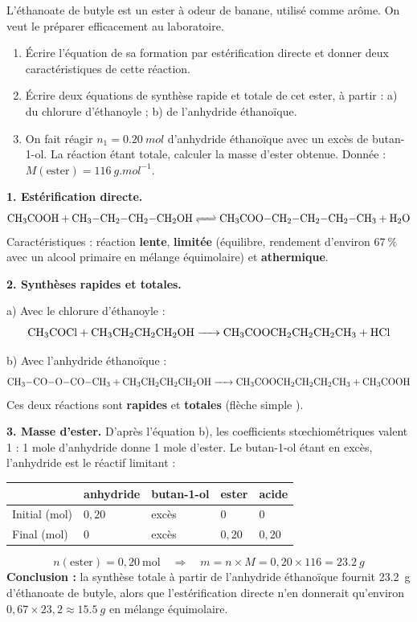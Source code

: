 \documentclass[11pt]{article}
\begin{document}
\begin{exoresolu}
L'éthanoate de butyle est un ester à odeur de banane, utilisé comme arôme. On veut le préparer efficacement au laboratoire.
\begin{enumerate}
\item Écrire l'équation de sa formation par estérification directe et donner deux caractéristiques de cette réaction.
\item Écrire deux équations de synthèse rapide et totale de cet ester, à partir : a) du chlorure d'éthanoyle ; b) de l'anhydride éthanoïque.
\item On fait réagir $n_1 = \SI{0,20}{mol}$ d'anhydride éthanoïque avec un excès de butan-1-ol. La réaction étant totale, calculer la masse d'ester obtenue. Donnée : $M(\text{ester}) = \SI{116}{g.mol^{-1}}$.
\end{enumerate}
\tcblower
\textbf{1. Estérification directe.}
\[ \ce{CH3COOH + CH3-CH2-CH2-CH2OH <=> CH3COO-CH2-CH2-CH2-CH3 + H2O} \]
Caractéristiques : réaction \textbf{lente}, \textbf{limitée} (équilibre, rendement d'environ $67\ \%$ avec un alcool primaire en mélange équimolaire) et \textbf{athermique}.

\textbf{2. Synthèses rapides et totales.}

a) Avec le chlorure d'éthanoyle :
\[ \ce{CH3COCl + CH3CH2CH2CH2OH -> CH3COOCH2CH2CH2CH3 + HCl} \]

b) Avec l'anhydride éthanoïque :
\[ \ce{CH3-CO-O-CO-CH3 + CH3CH2CH2CH2OH -> CH3COOCH2CH2CH2CH3 + CH3COOH} \]
Ces deux réactions sont \textbf{rapides} et \textbf{totales} (flèche simple \ce{->}).

\textbf{3. Masse d'ester.} D'après l'équation b), les coefficients stœchiométriques valent 1 : 1 mole d'anhydride donne 1 mole d'ester. Le butan-1-ol étant en excès, l'anhydride est le réactif limitant :
\begin{center}
\begin{tabularx}{\linewidth}{|l|X|X|X|X|}
\hline
\rowcolor{popblueL}
 & anhydride & butan-1-ol & ester & acide \\
\hline
Initial (mol) & $0,20$ & excès & $0$ & $0$ \\
\hline
Final (mol) & $0$ & excès & $0,20$ & $0,20$ \\
\hline
\end{tabularx}
\end{center}
\[
n(\text{ester}) = 0,20\ \text{mol} \quad\Rightarrow\quad m = n \times M = 0,20 \times 116 = \boxed{\SI{23,2}{g}}
\]
\textbf{Conclusion :} la synthèse totale à partir de l'anhydride éthanoïque fournit \SI{23,2}{g} d'éthanoate de butyle, alors que l'estérification directe n'en donnerait qu'environ $0,67 \times 23,2 \approx \SI{15,5}{g}$ en mélange équimolaire.
\end{exoresolu}
\end{document}
